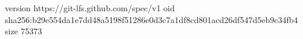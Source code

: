 version https://git-lfs.github.com/spec/v1
oid sha256:b29e554da1e7dd48a5198f51286e0d3c7a1df8cd801acd26df547d5eb9c34fb4
size 75373
